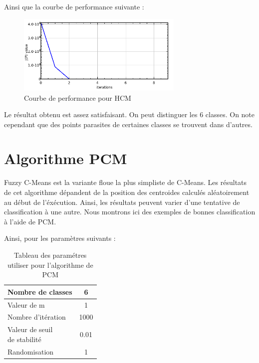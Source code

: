 \documentclass[a4paper,11pt]{article}
\begin{document}
Ainsi que la courbe de performance suivante :

\begin{figure}[H]
\begin{center}
\includegraphics[width=300px]{../img/Perf_HCM.png}
\end{center}
\caption{Courbe de performance pour HCM}
\end{figure}

Le résultat obtenu est assez satisfaisant. On peut distinguer les 6 classes. On note cependant que des points parasites de certaines classes se trouvent dans d'autres.

\section{Algorithme PCM}
Fuzzy C-Means est la variante floue la plus simpliste de C-Means. Les résultats de cet algorithme dépandent de la position des centroides calculés aléatoirement au début de l'éxécution. Ainsi, les résultats peuvent varier d'une tentative de classification à une autre. Nous montrons ici des exemples de bonnes classification à l'aide de PCM.

Ainsi, pour les paramètres suivants : 

\begin{table}[H]
  \begin{center}
    \begin{tabular}{|l|c|}
      \hline
      Nombre de classes & 6 \\
      \hline
      Valeur de m & 1 \\
      \hline
      Nombre d'itération & 1000 \\
      \hline
      \shortstack{ Valeur de seuil \\ de stabilité }  & 0.01 \\
      \hline
      Randomisation & 1 \\
      \hline
    \end{tabular}
    \caption{Tableau des paramétres utiliser pour l'algorithme de PCM}
  \end{center}
\end{table}
\end{document}
